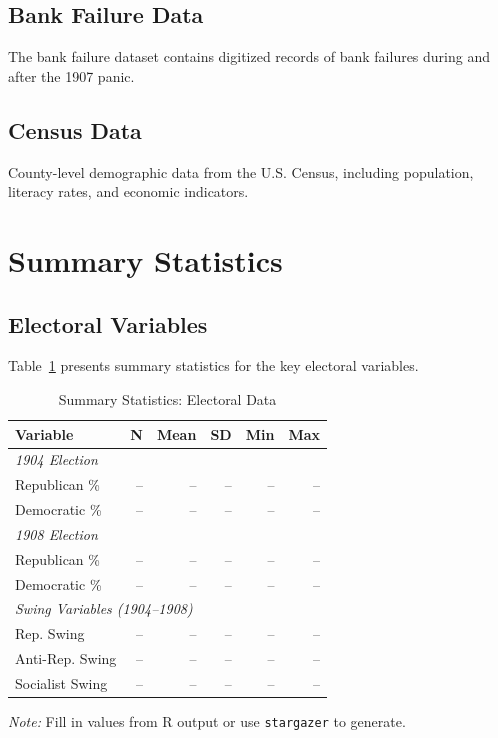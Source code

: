 \documentclass[11pt]{article}
\begin{document}
% 

\subsection{Bank Failure Data}

The bank failure dataset contains digitized records of bank failures during and after the 1907 panic.

% 

\subsection{Census Data}

County-level demographic data from the U.S. Census, including population, literacy rates, and economic indicators.

% 

\section{Summary Statistics}

\subsection{Electoral Variables}

Table~\ref{tab:elections_summary} presents summary statistics for the key electoral variables.

\begin{table}[H]
\centering
\caption{Summary Statistics: Electoral Data}
\label{tab:elections_summary}
\begin{tabular}{lrrrrr}
\toprule
Variable & N & Mean & SD & Min & Max \\
\midrule
\multicolumn{6}{l}{\textit{1904 Election}} \\
Republican \% & -- & -- & -- & -- & -- \\
Democratic \% & -- & -- & -- & -- & -- \\
\midrule
\multicolumn{6}{l}{\textit{1908 Election}} \\
Republican \% & -- & -- & -- & -- & -- \\
Democratic \% & -- & -- & -- & -- & -- \\
\midrule
\multicolumn{6}{l}{\textit{Swing Variables (1904--1908)}} \\
Rep. Swing & -- & -- & -- & -- & -- \\
Anti-Rep. Swing & -- & -- & -- & -- & -- \\
Socialist Swing & -- & -- & -- & -- & -- \\
\bottomrule
\end{tabular}
\vspace{0.5em}
\footnotesize\textit{Note:} Fill in values from R output or use \texttt{stargazer} to generate.
\end{table}
\end{document}
